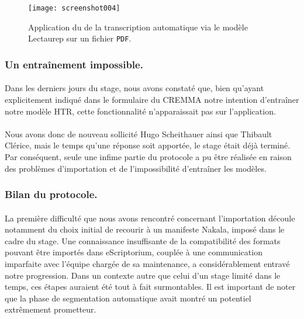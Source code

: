 \documentclass[a4paper,12pt,twoside]{book}
\begin{document}
\begin{figure}[H]
	\centering
	\texttt{[image: screenshot004]}
	\caption{Application du de la transcription automatique via le modèle Lectaurep sur un fichier \texttt{PDF}.}
	\label{fig:screenshot004}
\end{figure}





		\subsubsection{Un entraînement impossible.}
		
\paragraph{}
Dans les derniers jours du stage, nous avons constaté que, bien qu'ayant explicitement indiqué dans le formulaire du CREMMA notre intention d'entraîner notre modèle HTR, cette fonctionnalité n’apparaissait pas sur l’application. 

\paragraph{}
Nous avons donc de nouveau sollicité Hugo Scheithauer ainsi que Thibault Clérice, mais le temps qu’une réponse soit apportée, le stage était déjà terminé. Par conséquent, seule une infime partie du protocole a pu être réalisée en raison des problèmes d’importation et de l’impossibilité d’entraîner les modèles.

		\subsubsection{Bilan du protocole.}

\paragraph{}
La première difficulté que nous avons rencontré concernant l’importation découle notamment du choix initial de recourir à un manifeste Nakala, imposé dans le cadre du stage. Une connaissance insuffisante de la compatibilité des formats pouvant être importés dans eScriptorium, couplée à une communication imparfaite avec l’équipe chargée de sa maintenance, a considérablement entravé notre progression. Dans un contexte autre que celui d’un stage limité dans le temps, ces étapes auraient été tout à fait surmontables. Il est important de noter que la phase de segmentation automatique avait montré un potentiel extrêmement prometteur.
\end{document}
